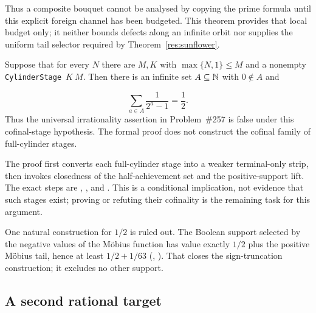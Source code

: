 \documentclass[11pt]{article}
\begin{document}
Thus a composite bouquet cannot be analysed by copying the prime formula
until this explicit foreign channel has been budgeted.  This theorem provides
that local budget only; it neither bounds defects along an infinite orbit nor
supplies the uniform tail selector required by Theorem~\ref{res:sunflower}.

\begin{theorem}
\label{res:cylinderhalf}
Suppose that for every $N$ there are $M,K$ with
$\max\{N,1\}\le M$ and a nonempty
\texttt{CylinderStage}~$K~M$.  Then there is an infinite set
$A\subseteq\mathbb{N}$ with $0\notin A$ and

\[
  \sum_{a\in A}\frac{1}{2^a-1}=\frac12.
\]
Thus the universal irrationality assertion in Problem~\#257 is false under
this cofinal-stage hypothesis.  The formal proof does not construct the
cofinal family of full-cylinder stages.
\end{theorem}

\noindent The proof first converts each full-cylinder stage into a weaker
terminal-only strip, then invokes closedness of the half-achievement set
and the positive-support lift.  The exact steps are
,
,
and
.
This is a conditional implication, not evidence that such stages exist;
proving or refuting their cofinality is the remaining task for this argument.

One natural construction for $1/2$ is ruled out.  The Boolean support selected by the
negative values of the M\"obius function has value exactly $1/2$ plus the
positive M\"obius tail, hence at least $1/2+1/63$
(,
).
That closes the sign-truncation construction; it excludes no other support.

\subsection{A second rational target}
\end{document}

